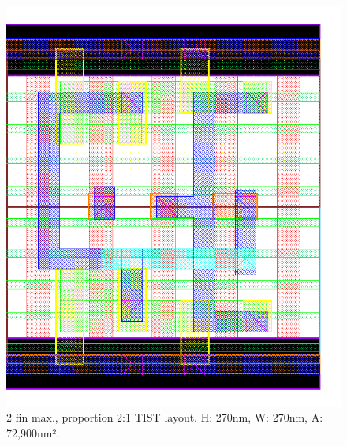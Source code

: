 \documentclass[diss,pgmicro,english]{iiufrgs}
\begin{document}
\begin{figure}[]
\centering
\includegraphics[width=\textwidth,height=\textheight,keepaspectratio]{TIST2F1F.png}
\caption{2 fin max., proportion 2:1 TIST layout. H: 270nm, W: 270nm, A: 72,900nm².}
\label{fig:TIST1F}
\end{figure}
\end{document}
